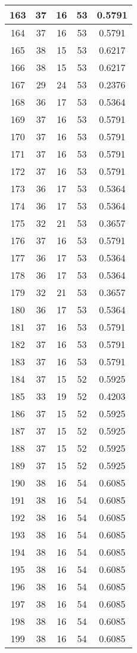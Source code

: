 \documentclass[letterpaper, 12pt]{article}
\begin{document}
\begin{longtable}{|c|c|c|c|c|}
\hline
163 & 37 & 16 & 53 & 0.5791 \\
\hline
164 & 37 & 16 & 53 & 0.5791 \\
\hline
165 & 38 & 15 & 53 & 0.6217 \\
\hline
166 & 38 & 15 & 53 & 0.6217 \\
\hline
167 & 29 & 24 & 53 & 0.2376 \\
\hline
168 & 36 & 17 & 53 & 0.5364 \\
\hline
169 & 37 & 16 & 53 & 0.5791 \\
\hline
170 & 37 & 16 & 53 & 0.5791 \\
\hline
171 & 37 & 16 & 53 & 0.5791 \\
\hline
172 & 37 & 16 & 53 & 0.5791 \\
\hline
173 & 36 & 17 & 53 & 0.5364 \\
\hline
174 & 36 & 17 & 53 & 0.5364 \\
\hline
175 & 32 & 21 & 53 & 0.3657 \\
\hline
176 & 37 & 16 & 53 & 0.5791 \\
\hline
177 & 36 & 17 & 53 & 0.5364 \\
\hline
178 & 36 & 17 & 53 & 0.5364 \\
\hline
179 & 32 & 21 & 53 & 0.3657 \\
\hline
180 & 36 & 17 & 53 & 0.5364 \\
\hline
181 & 37 & 16 & 53 & 0.5791 \\
\hline
182 & 37 & 16 & 53 & 0.5791 \\
\hline
183 & 37 & 16 & 53 & 0.5791 \\
\hline
184 & 37 & 15 & 52 & 0.5925 \\
\hline
185 & 33 & 19 & 52 & 0.4203 \\
\hline
186 & 37 & 15 & 52 & 0.5925 \\
\hline
187 & 37 & 15 & 52 & 0.5925 \\
\hline
188 & 37 & 15 & 52 & 0.5925 \\
\hline
189 & 37 & 15 & 52 & 0.5925 \\
\hline
190 & 38 & 16 & 54 & 0.6085 \\
\hline
191 & 38 & 16 & 54 & 0.6085 \\
\hline
192 & 38 & 16 & 54 & 0.6085 \\
\hline
193 & 38 & 16 & 54 & 0.6085 \\
\hline
194 & 38 & 16 & 54 & 0.6085 \\
\hline
195 & 38 & 16 & 54 & 0.6085 \\
\hline
196 & 38 & 16 & 54 & 0.6085 \\
\hline
197 & 38 & 16 & 54 & 0.6085 \\
\hline
198 & 38 & 16 & 54 & 0.6085 \\
\hline
199 & 38 & 16 & 54 & 0.6085 \\
\hline
\end{longtable}
\end{document}
